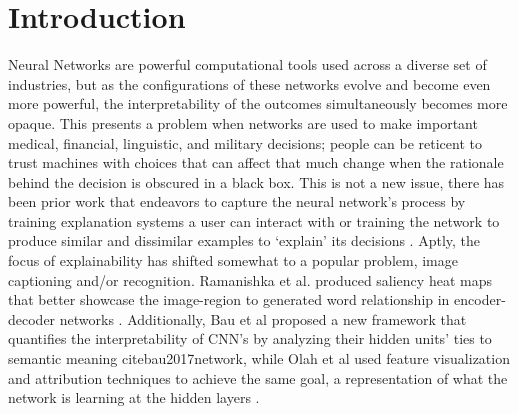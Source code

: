 \section{Introduction}

\label{sec:intro}

Neural Networks are powerful computational tools used across a diverse set of industries, but as the configurations of these networks evolve and become even more powerful, the interpretability of the outcomes simultaneously becomes more opaque. This presents a problem when networks are used to make important medical, financial, linguistic, and military decisions; people can be reticent to trust machines with choices that can affect that much change when the rationale behind the decision is obscured in a black box. This is not a new issue, there has been prior work that endeavors to capture the neural network’s process by training explanation systems a user can interact with \cite{van2004explainable} or training the network to produce similar and dissimilar examples to ‘explain’ its decisions  \cite{yang2017explainable}. Aptly, the focus of explainability has shifted somewhat to a popular problem, image captioning and/or recognition. Ramanishka et al. produced saliency heat maps that better showcase the image-region to generated word relationship in encoder-decoder networks \cite{ramanishka2017top}. Additionally, Bau et al proposed a new framework that quantifies the interpretability of CNN’s by analyzing their hidden units’ ties to semantic meaning cite{bau2017network}, while Olah et al used feature visualization and attribution techniques to achieve the same goal, a representation of what the network is learning at the hidden layers \cite{ olah2018the}.
